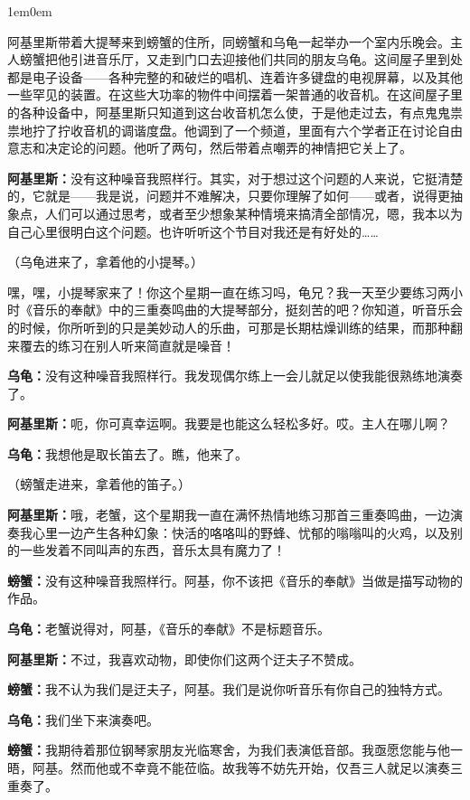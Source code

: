 \documentclass[
  12pt,
  twoside,
  openright,
  oldfontcommands,
]{memoir}
\newcommand{\dialogname}[1]{{\heifamily\bfseries #1}}
\newenvironment{dialogguide}{%
  \begin{adjustwidth}{1em}{0em}\kaitifamily\itshape\small%
}{%
  \end{adjustwidth}%
}
\begin{document}
\begin{dialogguide}
阿基里斯带着大提琴来到螃蟹的住所，同螃蟹和乌龟一起举办一个室内乐晚会。主人螃蟹把他引进音乐厅，又走到门口去迎接他们共同的朋友乌龟。这间屋子里到处都是电子设备------各种完整的和破烂的唱机、连着许多键盘的电视屏幕，以及其他一些罕见的装置。在这些大功率的物件中间摆着一架普通的收音机。在这间屋子里的各种设备中，阿基里斯只知道到这台收音机怎么使，于是他走过去，有点鬼鬼祟祟地拧了拧收音机的调谐度盘。他调到了一个频道，里面有六个学者正在讨论自由意志和决定论的问题。他听了两句，然后带着点嘲弄的神情把它关上了。
\end{dialogguide}

\dialogname{阿基里斯：}没有这种噪音我照样行。其实，对于想过这个问题的人来说，它挺清楚的，它就是------我是说，问题并不难解决，只要你理解了如何------或者，说得更抽象点，人们可以通过思考，或者至少想象某种情境来搞清全部情况，嗯，我本以为自己心里很明白这个问题。也许听听这个节目对我还是有好处的\ldots\ldots{}

（乌龟进来了，拿着他的小提琴。）

嘿，嘿，小提琴家来了！你这个星期一直在练习吗，龟兄？我一天至少要练习两小时《音乐的奉献》中的三重奏鸣曲的大提琴部分，挺刻苦的吧？你知道，听音乐会的时候，你所听到的只是美妙动人的乐曲，可那是长期枯燥训练的结果，而那种翻来覆去的练习在别人听来简直就是噪音！

\dialogname{乌龟：}没有这种噪音我照样行。我发现偶尔练上一会儿就足以使我能很熟练地演奏了。

\dialogname{阿基里斯：}呃，你可真幸运啊。我要是也能这么轻松多好。哎。主人在哪儿啊？

\dialogname{乌龟：}我想他是取长笛去了。瞧，他来了。

（螃蟹走进来，拿着他的笛子。）

\dialogname{阿基里斯：}哦，老蟹，这个星期我一直在满怀热情地练习那首三重奏鸣曲，一边演奏我心里一边产生各种幻象：快活的咯咯叫的野蜂、忧郁的嗡嗡叫的火鸡，以及别的一些发着不同叫声的东西，音乐太具有魔力了！

\dialogname{螃蟹：}没有这种噪音我照样行。阿基，你不该把《音乐的奉献》当做是描写动物的作品。

\dialogname{乌龟：}老蟹说得对，阿基，《音乐的奉献》不是标题音乐。

\dialogname{阿基里斯：}不过，我喜欢动物，即使你们这两个迂夫子不赞成。

\dialogname{螃蟹：}我不认为我们是迂夫子，阿基。我们是说你听音乐有你自己的独特方式。

\dialogname{乌龟：}我们坐下来演奏吧。

\dialogname{螃蟹：}我期待着那位钢琴家朋友光临寒舍，为我们表演低音部。我亟愿您能与他一晤，阿基。然而他或不幸竟不能莅临。故我等不妨先开始，仅吾三人就足以演奏三重奏了。
\end{document}
